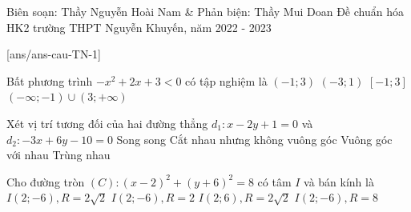 \begin{name}
	{Biên soạn: Thầy Nguyễn Hoài Nam \& Phản biện: Thầy Mui Doan}
	{Đề chuẩn hóa HK2 trường THPT Nguyễn Khuyến, năm 2022 - 2023}
\end{name}
\cautn
{}[ans/ans-cau-TN-1]
\begin{ex}%
	Bất phương trình $-x^2+2x+3<0$ có tập nghiệm là
	\choice
	{$(-1;3)$}
	{$(-3;1)$}
	{$[-1;3]$}
	{\True$(-\infty;-1) \cup (3;+\infty)$}
\end{ex}
\begin{ex}%
	Xét vị trí tương đối của hai đường thẳng $d_1\colon x-2y+1=0$ và $d_2\colon -3x+6y-10=0$
	\choice
	{\True Song song}
	{Cắt nhau nhưng không vuông góc}
	{Vuông góc với nhau}
	{Trùng nhau}
\end{ex}
\begin{ex}%
	Cho đường tròn $\left(C\right)\colon (x-2)^2+(y+6)^2=8$ có tâm $I$ và bán kính là
	\choice
	{\True $I(2;-6),R=2\sqrt{2}$}
	{$I(2;-6),R=2$}
	{$I(2;6),R=2\sqrt{2}$}
	{$I(2;-6),R=8$}
\end{ex}

